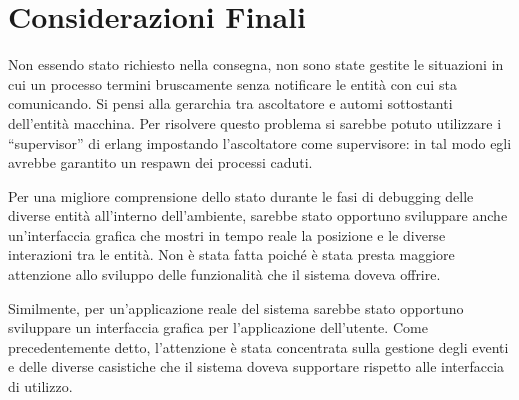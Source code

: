 
\chapter{Considerazioni Finali}

Non essendo stato richiesto nella consegna, non sono state gestite le situazioni in cui un processo termini bruscamente senza notificare le entità con cui sta comunicando. Si pensi alla gerarchia tra ascoltatore e automi sottostanti dell'entità macchina. Per risolvere questo problema si sarebbe potuto utilizzare i ``supervisor'' di erlang impostando l'ascoltatore come supervisore: in tal modo egli avrebbe garantito un respawn dei processi caduti.

Per una migliore comprensione dello stato durante le fasi di debugging delle diverse entità all'interno dell'ambiente, sarebbe stato opportuno sviluppare anche un'interfaccia grafica che mostri in tempo reale la posizione e le diverse interazioni tra le entità. Non è stata fatta poiché è stata presta maggiore attenzione allo sviluppo delle funzionalità che il sistema doveva offrire. 

Similmente, per un'applicazione reale del sistema sarebbe stato opportuno sviluppare un interfaccia grafica per l'applicazione dell'utente. Come precedentemente detto, l'attenzione è stata concentrata sulla gestione degli eventi e delle diverse casistiche che il sistema doveva supportare rispetto alle interfaccia di utilizzo.

